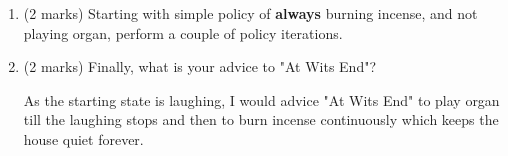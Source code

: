 \documentclass[addpoints,12pt,solution]{exam}
\begin{document}
\begin{questions}
\begin{enumerate}[label=(\alph*)]
\begin{solution}
\vspace{15pt}
\begin{center}

\end{center}
\end{solution}

    \item (2 marks) Starting with simple policy of \textbf{always} burning incense, and not playing organ, perform a couple of policy iterations.
\begin{solution}
\end{solution}
    
    \item (2 marks) Finally, what is your advice to "At Wits End"?
\begin{solution}
As the starting state is laughing, I would advice "At Wits End" to play organ till the laughing stops and then to burn incense continuously which keeps the house quiet forever.
\end{solution}
    
    
\end{enumerate}


\end{questions}
\end{document}
